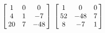 {$\left[\hskip -3pt \begin{array}{ccc} 1&0&0\\  4&1&-7
\\  20&7&-48\end{array}\hskip -3pt \right] $
 }
{$ \left[\hskip -3pt \begin{array}{ccc} 1&0&0\\  52&-48&7
\\  8&-7&1\end{array}\hskip -3pt \right]$}
